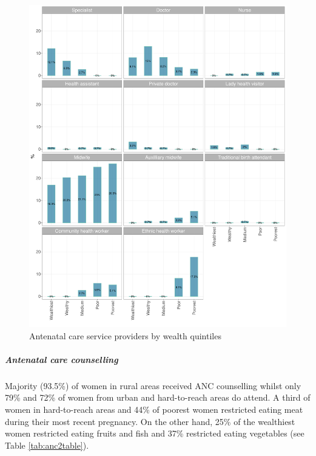 \documentclass[12pt,a4paper]{article}
\let\oldsubparagraph\subparagraph
\renewcommand{\subparagraph}[1]{\oldsubparagraph{#1}\mbox{}}
\begin{document}
\begin{figure}[H]

{\centering \includegraphics{kayahReport_files/figure-latex/anc2Plot-1} 

}

\caption{Antenatal care service providers by wealth quintiles}\label{fig:anc2Plot}
\end{figure}

\hypertarget{ancCounselling}{%
\subparagraph{Antenatal care counselling}\label{ancCounselling}}

Majority (93.5\%) of women in rural areas received ANC counselling whilst only 79\% and 72\% of women from urban and hard-to-reach areas do attend. A third of women in hard-to-reach areas and 44\% of poorest women restricted eating meat during their most recent pregnancy. On the other hand, 25\% of the wealthiest women restricted eating fruits and fish and 37\% restricted eating vegetables (see Table \ref{tab:anc2table}).
\end{document}
